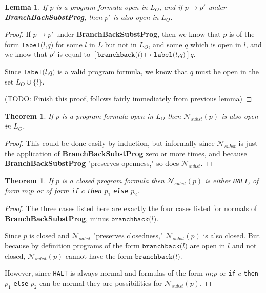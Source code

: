 \documentclass[11pt]{article}
\begin{document}
\newtheorem*{bbppreservesopenness}{Lemma}
\begin{bbppreservesopenness}
If $p$ is a program formula open in $L_{O}$, and if $p \longrightarrow p'$ under \textbf{BranchBackSubstProg}, then $p'$ is also open in $L_{O}$.
\end{bbppreservesopenness}
\begin{proof}
If $p \longrightarrow p'$ under \textbf{BranchBackSubstProg}, then we know that $p$ is of the form $\texttt{label(}l\texttt{,} q \texttt{)}$ for some $l$ in $L$ but not in $L_{O}$, and some $q$ which is open in $l$, and we know that $p'$ is equal to $[\texttt{branchback(}l\texttt{)} \mapsto \texttt{label(}l\texttt{,} q\texttt{)}]q$.

Since $\texttt{label(}l\texttt{,} q \texttt{)}$ is a valid program formula, we know that $q$ must be open in the set $L_{O} \cup \{l\}$.

(TODO: Finish this proof, follows fairly immediately from previous lemma)
\end{proof}

\newtheorem*{nsubstpreservesopenness}{Theorem}
\begin{nsubstpreservesopenness}
If $p$ is a program formula open in $L_{O}$ then $\mathcal{N}_{subst}(p)$ is also open in $L_{O}$.
\end{nsubstpreservesopenness}
\begin{proof}
This could be done easily by induction, but informally since $\mathcal{N}_{subst}$ is just the application of \textbf{BranchBackSubstProg} zero or more times, and because \textbf{BranchBackSubstProg} "preserves openness," so does $\mathcal{N}_{subst}$.
\end{proof}

\newtheorem*{openformulanormalforms}{Theorem}
\begin{openformulanormalforms}
If $p$ is a closed program formula then $\mathcal{N}_{subst}(p)$ is either \texttt{HALT}, of form $m\texttt{;}p$ or of form \texttt{if} $c$ \texttt{then} $p_{1}$ \texttt{else} $p_{2}$.
\end{openformulanormalforms}

\begin{proof}
The three cases listed here are exactly the four cases listed for normals of \textbf{BranchBackSubstProg}, minus $\texttt{branchback(}l\texttt{)}$.

Since $p$ is closed and $\mathcal{N}_{subst}$ "preserves closedness," $\mathcal{N}_{subst}(p)$ is also closed.  But because by definition programs of the form $\texttt{branchback(}l\texttt{)}$ are open in ${l}$ and not closed, $\mathcal{N}_{subst}(p)$ cannot have the form $\texttt{branchback(}l\texttt{)}$.

However, since \texttt{HALT} is always normal and formulas of the form $m\texttt{;}p$ or \texttt{if} $c$ \texttt{then} $p_{1}$ \texttt{else} $p_{2}$ can be normal they are possibilities for $\mathcal{N}_{subst}(p)$.
\end{proof}
\end{document}
